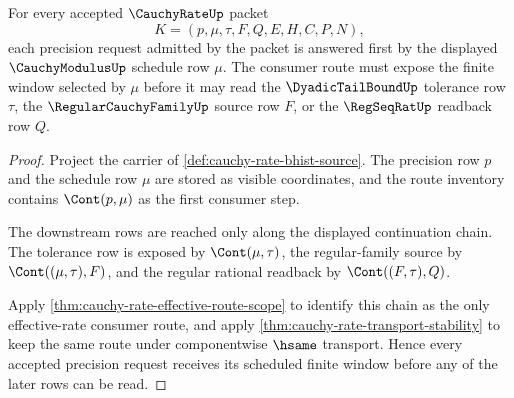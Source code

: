\begin{theorem}
\label{thm:cauchy-rate-scheduled-window-totality}
For every accepted $\CauchyRateUp$ packet
$$
K=(p,\mu,\tau,F,Q,E,H,C,P,N),
$$
each precision request admitted by the packet is answered first by the displayed $\CauchyModulusUp$ schedule row $\mu$. The consumer route must expose the finite window selected by $\mu$ before it may read the $\DyadicTailBoundUp$ tolerance row $\tau$, the $\RegularCauchyFamilyUp$ source row $F$, or the $\RegSeqRatUp$ readback row $Q$.
\end{theorem}
\begin{proof}
Project the carrier of \autoref{def:cauchy-rate-bhist-source}. The precision row $p$ and the schedule row $\mu$ are stored as visible coordinates, and the route inventory contains $\Cont(p,\mu)$ as the first consumer step.

The downstream rows are reached only along the displayed continuation chain. The tolerance row is exposed by $\Cont(\mu,\tau)$, the regular-family source by $\Cont((\mu,\tau),F)$, and the regular rational readback by $\Cont((F,\tau),Q)$.

Apply \autoref{thm:cauchy-rate-effective-route-scope} to identify this chain as the only effective-rate consumer route, and apply \autoref{thm:cauchy-rate-transport-stability} to keep the same route under componentwise $\hsame$ transport. Hence every accepted precision request receives its scheduled finite window before any of the later rows can be read.
\end{proof}

